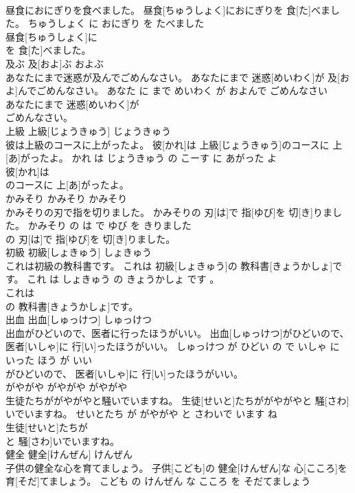 \documentclass[8pt]{extreport}
\begin{document}
\begin{CJK}{UTF8}{min}
\\	昼食におにぎりを食べました。	昼食[ちゅうしょく]におにぎりを 食[た]べました。	ちゅうしょく に おにぎり を たべました	
\\	昼食[ちゅうしょく]に
\\	を 食[た]べました。			
\\	及ぶ	及[およ]ぶ	およぶ	
\\	あなたにまで迷惑が及んでごめんなさい。	あなたにまで 迷惑[めいわく]が 及[およ]んでごめんなさい。	あなた に まで めいわく が およんで ごめんなさい	
\\	あなたにまで 迷惑[めいわく]が
\\	ごめんなさい。			
\\	上級	上級[じょうきゅう]	じょうきゅう	
\\	彼は上級のコースに上がったよ。	彼[かれ]は 上級[じょうきゅう]のコースに 上[あ]がったよ。	かれ は じょうきゅう の こーす に あがった よ	
\\	彼[かれ]は
\\	のコースに 上[あ]がったよ。			
\\	かみそり	かみそり	かみそり	
\\	かみそりの刃で指を切りました。	かみそりの 刃[は]で 指[ゆび]を 切[き]りました。	かみそり の は で ゆび を きりました	
\\	の 刃[は]で 指[ゆび]を 切[き]りました。			
\\	初級	初級[しょきゅう]	しょきゅう	
\\	これは初級の教科書です。	これは 初級[しょきゅう]の 教科書[きょうかしょ]です。	これ は しょきゅう の きょうかしょ です 。	
\\	これは
\\	の 教科書[きょうかしょ]です。			
\\	出血	出血[しゅっけつ]	しゅっけつ	
\\	出血がひどいので、医者に行ったほうがいい。	出血[しゅっけつ]がひどいので、 医者[いしゃ]に 行[い]ったほうがいい。	しゅっけつ が ひどい の で いしゃ に いった ほう が いい	
\\	がひどいので、 医者[いしゃ]に 行[い]ったほうがいい。			
\\	がやがや	がやがや	がやがや	
\\	生徒たちががやがやと騒いでいますね。	生徒[せいと]たちががやがやと 騒[さわ]いでいますね。	せいとたち が がやがや と さわいで います ね	
\\	生徒[せいと]たちが
\\	と 騒[さわ]いでいますね。			
\\	健全	健全[けんぜん]	けんぜん	
\\	子供の健全な心を育てましょう。	子供[こども]の 健全[けんぜん]な 心[こころ]を 育[そだ]てましょう。	こども の けんぜん な こころ を そだてましょう	

\end{CJK}
\end{document}

